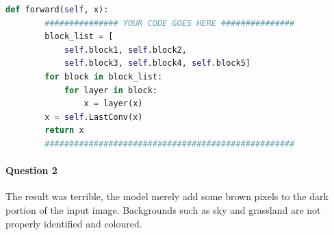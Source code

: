 \documentclass[12pt]{article}
\begin{document}
\begin{lstlisting}[language=Python]
    def forward(self, x):
        ############### YOUR CODE GOES HERE ###############
        block_list = [
            self.block1, self.block2,
            self.block3, self.block4, self.block5]
        for block in block_list:
            for layer in block:
                x = layer(x)
        x = self.LastConv(x)
        return x
        ###################################################
	\end{lstlisting}
	
	\paragraph{Question 2} The result was terrible, the model merely add some brown pixels to the dark portion of the input image. Backgrounds such as sky and grassland are not properly identified and coloured.
	
\end{document}
